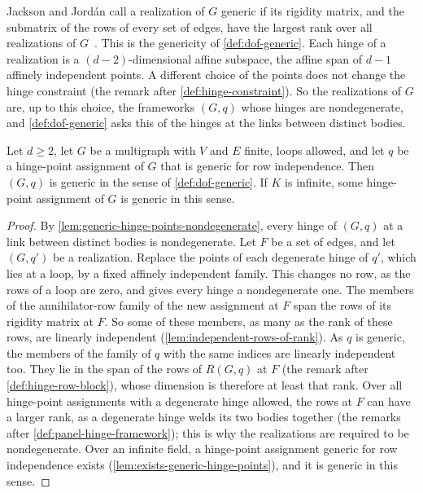 Jackson and Jord\'an call a realization of $G$ generic if its rigidity
matrix, and the submatrix of the rows of every set of edges, have the
largest rank over all realizations of $G$~\cite[\S6]{jacksonJordan2009}.
This is the genericity of \cref{def:dof-generic}. Each hinge of a
realization is a $(d-2)$-dimensional affine subspace, the affine span
of $d - 1$ affinely independent points. A different choice of the
points does not change the hinge constraint (the remark after
\cref{def:hinge-constraint}). So the realizations of $G$ are, up to
this choice, the frameworks $(G, q)$ whose hinges are nondegenerate,
and \cref{def:dof-generic} asks this of the hinges at the links
between distinct bodies.

\begin{lemma}
  \label{lem:generic-hinge-points-max-rank}
  \leanok
  Let $d \ge 2$, let $G$ be a multigraph with $V$ and $E$ finite, loops
  allowed, and let $q$ be a hinge-point assignment of $G$ that is
  generic for row independence. Then $(G, q)$ is generic in the sense of
  \cref{def:dof-generic}. If $K$ is infinite, some hinge-point assignment
  of $G$ is generic in this sense.
\end{lemma}
\begin{proof}
  \leanok
  By \cref{lem:generic-hinge-points-nondegenerate}, every hinge of
  $(G, q)$ at a link between distinct bodies is nondegenerate. Let $F$
  be a set of edges, and let $(G, q')$ be a realization. Replace the
  points of each degenerate hinge of $q'$, which lies at a loop, by a
  fixed affinely independent family. This changes no row, as the rows
  of a loop are zero, and gives every hinge a nondegenerate one. The
  members of the annihilator-row family of the new assignment at $F$
  span the rows of its rigidity matrix at $F$. So some of these
  members, as many as the rank of these rows, are linearly independent
  (\cref{lem:independent-rows-of-rank}). As $q$ is generic, the
  members of the family of $q$ with the same indices are linearly
  independent too. They lie in the span of the
  rows of $R(G, q)$ at $F$ (the remark after
  \cref{def:hinge-row-block}), whose dimension is therefore at least
  that rank. Over all hinge-point assignments with a degenerate hinge
  allowed, the rows at $F$ can have a larger rank, as a degenerate
  hinge welds its two bodies together (the remarks after
  \cref{def:panel-hinge-framework}); this is why the realizations are
  required to be nondegenerate. Over an infinite field, a hinge-point
  assignment generic for row independence exists
  (\cref{lem:exists-generic-hinge-points}), and it is generic in this
  sense.
\end{proof}

